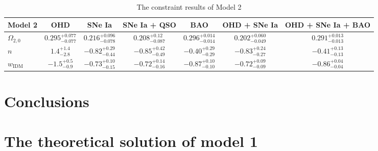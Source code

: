 \documentclass[twocolumn]{aastex631}
\begin{document}
   \begin{table}[htbp]
      \caption{The constraint results of Model 2}
      \centering
      \begin{tabular}{lcccccc}
         \hline\hline
         Model 2 & OHD & SNe Ia & SNe Ia + QSO & BAO &
          OHD + SNe Ia & OHD + SNe Ia + BAO \\
         \hline
         $\Omega_{2,0}$ & $0.295_{-0.077}^{+0.077}$ & $0.216_{-0.078}^{+0.096}$
          & $0.208_{-0.087}^{+0.12}$ & $0.296_{-0.014}^{+0.014}$
          & $0.202_{-0.049}^{+0.060}$ & $0.291_{-0.013}^{+0.013}$ \\
         $n$ & $1.4_{-2.8}^{+1.4}$ & $-0.82_{-0.44}^{+0.29}$
          & $-0.85_{-0.49}^{+0.42}$ & $-0.40_{-0.29}^{+0.29}$
          & $-0.83_{-0.27}^{+0.24}$ & $-0.41_{-0.13}^{+0.13}$ \\
         $w_{\text{IDM}}$ & $-1.5_{-0.9}^{+0.5}$ & $-0.73_{-0.15}^{+0.10}$
          & $-0.72_{-0.16}^{+0.14}$ & $-0.87_{-0.10}^{+0.10}$
          & $-0.72_{-0.09}^{+0.09}$ & $-0.86_{-0.04}^{+0.04}$ \\
         \hline
      \end{tabular}
      \label{tab:6}
   \end{table}

\section{Conclusions}

\appendix

\section{The theoretical solution of model 1}
\end{document}
